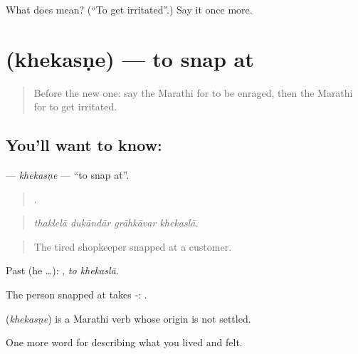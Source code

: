 \begin{tcolorbox}[breakable,colback=teal!4,colframe=teal!35!black,title={Before you move on}]
What does  mean? (\textquotedblleft{}To get irritated\textquotedblright{}.) Say it once more.
\end{tcolorbox}
\section[\texorpdfstring{\mr{खेकसणे} (khekasṇe)}{खेकसणे (khekasṇe)}]{ (khekasṇe) — to snap at}

\label{lesson:MR-C453-khekasne}



\begin{quote}
Before the new one: say the Marathi for to be enraged, then the Marathi for to get irritated.
\end{quote}

\subsection*{You'll want to know: }
\textbf{} — \emph{khekasṇe} — \textquotedblleft{}to snap at\textquotedblright{}.

\begin{quote}
   .
\end{quote}

\begin{quote}
\emph{thaklelā dukāndār grāhkāvar khekaslā.}
\end{quote}

\begin{quote}
The tired shopkeeper snapped at a customer.
\end{quote}

Past (he …):  , \emph{to khekaslā}.

The person snapped at takes -:   .

\begin{cousinweb}
\textbf{} (\emph{khekasṇe}) is a Marathi verb whose origin is not settled.
\end{cousinweb}

\begin{grammarlens}[title={What you've built}]
One more word for describing what you lived and felt.
\end{grammarlens}

